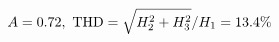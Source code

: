 \documentclass[preview]{standalone}
\begin{document}
\begin{align*}
\special{dvisvgm:raw <g id='unique000'>}A=0.72,\ \text{THD}=\sqrt{H_2^2+H_3^2}/H_1=13.4\%\special{dvisvgm:raw </g>}
\end{align*}
\end{document}
